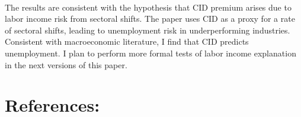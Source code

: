 \documentclass[12pt]{article}
\begin{document}
\paragraph{}
The results are consistent with the hypothesis that CID premium arises due to labor income risk from sectoral shifts. The paper uses CID as a proxy for a rate of sectoral shifts, leading to unemployment risk in underperforming industries. Consistent with macroeconomic literature, I find that CID predicts unemployment. I plan to perform more formal tests of labor income explanation in the next versions of this paper.


\newpage
\section{References:}
\begin{enumerate}


\end{enumerate}
\end{document}
